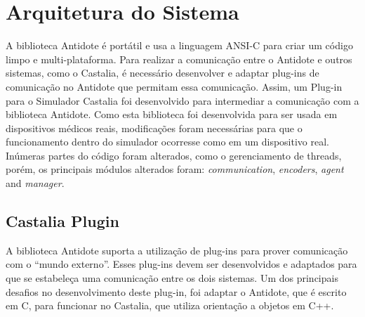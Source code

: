 \section{Arquitetura do Sistema}\label{systemarch}

A biblioteca Antidote é portátil e usa a linguagem ANSI-C para criar um código limpo e multi-plataforma. Para realizar a comunicação entre o Antidote e outros sistemas, como o Castalia, é necessário desenvolver e adaptar plug-ins de comunicação no Antidote que permitam essa comunicação. Assim, um Plug-in para o Simulador Castalia foi desenvolvido para intermediar a comunicação com a biblioteca Antidote. Como esta biblioteca foi desenvolvida para ser usada em dispositivos médicos reais, modificações foram necessárias para que o funcionamento dentro do simulador ocorresse como em um dispositivo real. Inúmeras partes do código foram alterados, como o gerenciamento de threads, porém, os principais módulos alterados foram: \textit{communication}, \textit{encoders}, \textit{agent} and \textit{manager}.

\subsection{Castalia Plugin}

A biblioteca Antidote suporta a utilização de plug-ins para prover comunicação com o ``mundo externo''. Esses plug-ins devem ser desenvolvidos e adaptados para que se estabeleça uma comunicação entre os dois sistemas. Um dos principais desafios no desenvolvimento deste plug-in, foi adaptar o Antidote, que é escrito em C, para funcionar no Castalia, que utiliza orientação a objetos em C++. 

